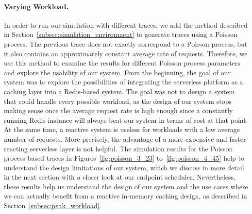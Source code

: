 \paragraph{Varying Workload.}
In order to run our simulation with different traces, we add the method described in Section~\ref{subsec:simulation_environment} to generate traces using a Poisson process. The previous trace does not exactly correspond to a Poisson process, but it also contains an approximately constant average rate of requests. Therefore, we use this method to examine the results for different Poisson process parameters and explore the usability of our system. From the beginning, the goal of our system was to explore the possibilities of integrating the serverless platform as a caching layer into a Redis-based system. The goal was not to design a system that could handle every possible workload, as the design of our system stops making sense once the average request rate is high enough since a constantly running Redis instance will always beat our system in terms of cost at that point. At the same time, a reactive system is useless for workloads with a low average number of requests. More precisely, the advantage of a more expensive and faster reacting serverless layer is not helpful. The simulation results for the Poisson process-based traces in Figures~\ref{fig:poisson_3_23} to~\ref{fig:poisson_4_45} help to understand the design limitations of our system, which we discuss in more detail in the next section with a closer look at our endpoint scheduler. Nevertheless, these results help us understand the design of our system and the use cases where we can actually benefit from a reactive in-memory caching design, as described in Section~\ref{subsec:peak_workload}.

